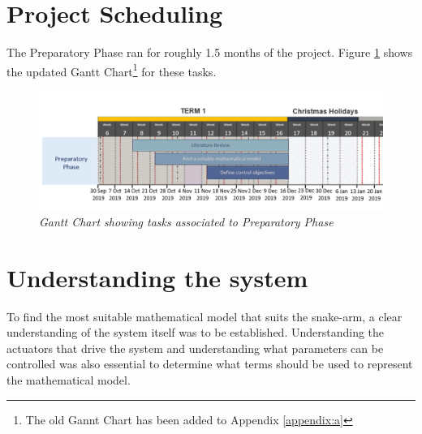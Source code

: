 \documentclass[a4paper,12pt]{report}
\begin{document}
\section{Project Scheduling}
The Preparatory Phase ran for roughly 1.5 months of the project. Figure \ref{gc-1} shows the updated Gantt Chart\footnote{The old Gannt Chart has been added to Appendix \ref{appendix:a}} for these tasks. 
\begin{figure}[h]
	\centering
	\includegraphics[width=\textwidth]{images/GC-chap2.png}
	\caption{\textit{Gantt Chart showing tasks associated to Preparatory Phase}}
	\label{gc-1}
\end{figure}


\section{Understanding the system}
To find the most suitable mathematical model that suits the snake-arm, a clear understanding of the system itself was to be established. Understanding the actuators that drive the system and understanding what parameters can be controlled was also essential to determine what terms should be used to represent the mathematical model.
\end{document}
